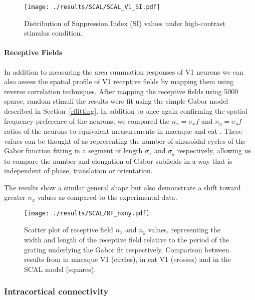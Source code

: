 \begin{figure}
	\centering
        \texttt{[image: ./results/SCAL/SCAL\_V1\_SI.pdf]}
	\caption{Distribution of Suppression Index (SI) values under
      high-contrast stimulus condition.}
	\label{SCALSI}
\end{figure}


\paragraph{Receptive Fields}

In addition to measuring the area summation responses of V1 neurons we
can also assess the spatial profile of V1 receptive fields by mapping
them using reverse correlation techniques. After mapping the receptive
fields using 5000 sparse, random stimuli the results were fit using
the simple Gabor model described in Section~\ref{rffitting}. In
addition to once again confirming the spatial frequency preference of
the neurons, we compared the $n_x=\sigma_x f$ and $n_y=\sigma_y f$
ratios of the neurons to equivalent measurements in macaque
\citep{Ringach2002b} and cat \citep{Jones1987}. These values can be
thought of as representing the number of sinusoidal cycles of the
Gabor function fitting in a segment of length $\sigma_x$ and
$\sigma_y$ respectively, allowing us to compare the number and
elongation of Gabor subfields in a way that is independent of phase,
translation or orientation.

The results show a similar general shape but also demonstrate a shift
toward greater $n_x$ values as compared to the experimental data.

\begin{figure}
	\centering
        \texttt{[image: ./results/SCAL/RF\_nxny.pdf]}
	\caption[Relative elongation and width of V1 receptive fields. A
      comparison between SCAL, cat V1 \cite{Jones1987} and macaque V1
      \cite{Ringach2002b}.]{Scatter plot of receptive field $n_x$ and
      $n_y$ values, representing the width and length of the receptive
      field relative to the period of the grating underlying the Gabor
      fit respectively. Comparison between results from
      \cite{Ringach2002b} in macaque V1 (circles), \cite{Jones1987} in
      cat V1 (crosses) and in the SCAL model (squares).}
	\label{RFFits}
\end{figure}

\subsubsection*{Intracortical connectivity}

